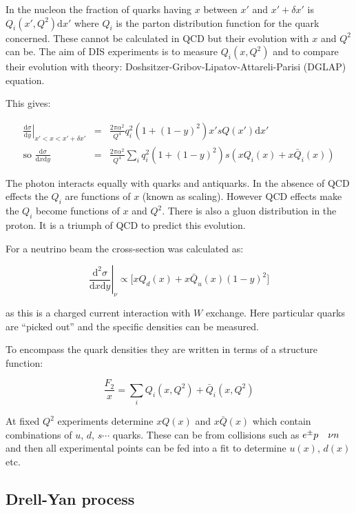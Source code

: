 In the nucleon the fraction of quarks having $x$ between $x'$ and $x' + \delta x'$ is $Q_i(x',Q^2) \mathrm{d}x'$ where $Q_i$ is the parton distribution function for the quark concerned.  These cannot be calculated in QCD but their evolution with $x$ and $Q^2$ can be.  The aim of DIS experiments is to measure $Q_i(x,Q^2)$ and to compare their evolution with theory:  Doshsitzer-Gribov-Lipatov-Attareli-Parisi (DGLAP) equation.

This gives:

\begin{eqnarray*}
  \left.\frac{\mathrm{d}\sigma}{\mathrm{d}y}\right|_{x'<x<x' + \delta x'} & = & \frac{2\pi\alpha^2}{Q^4}q_i^2\left(1 + \left(1 - y\right)^2\right)x'sQ(x')\mathrm{d}x' \\
  \textrm{so } \frac{\mathrm{d}\sigma}{\mathrm{d}x\mathrm{d}y} & = & \frac{2\pi\alpha^2}{Q^4}\sum_i q_i^2\left(1 + \left(1 - y\right)^2\right)s\left(xQ_i(x) + x\bar{Q}_i(x)\right)
\end{eqnarray*}

The photon interacts equally with quarks and antiquarks.  In the absence of QCD effects the $Q_i$ are functions of $x$ (known as scaling).  However QCD effects make the $Q_i$ become functions of $x$ and $Q^2$.  There is also a gluon distribution in the proton.  It is a triumph of QCD to predict this evolution.

For a neutrino beam the cross-section was calculated as:

\[
  \left.\frac{\mathrm{d}^2\sigma}{\mathrm{d}x\mathrm{d}y}\right|_{\nu} \propto \Big[xQ_d(x) + x\bar{Q}_u(x)\left(1 - y\right)^2\Big]
\]

as this is a charged current interaction with $W$ exchange.  Here particular quarks are ``picked out'' and the specific densities can be measured.

To encompass the quark densities they are written in terms of a structure function:

\[
  \frac{F_2}{x} = \sum_i Q_i(x,Q^2) + \bar{Q}_i(x,Q^2)
\]

At fixed $Q^2$ experiments determine $xQ(x)$ and $x\bar{Q}(x)$ which contain combinations of $u$, $d$, $s \cdots$ quarks.  These can be from collisions such as $e^{\pm}p \quad \nu n$ and then all experimental points can be fed into a fit to determine $u(x)$, $d(x)$ etc.

\subsection{Drell-Yan process}

